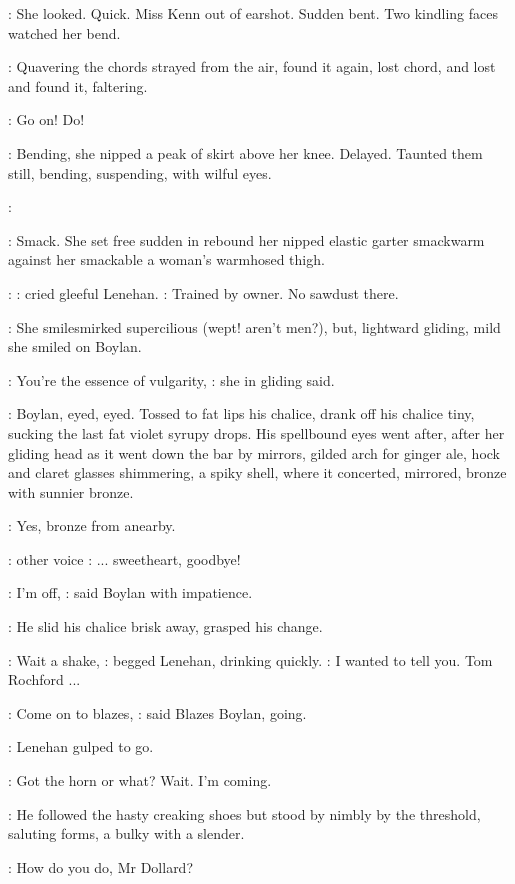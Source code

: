 :
She looked. Quick. Miss Kenn out of earshot. Sudden bent. Two
kindling faces watched her bend.

:
Quavering the chords strayed from the air, found it again, lost chord,
and lost and found it, faltering.

\Lenehan:
Go on! Do! 

:
Bending, she nipped a peak of skirt above her knee.
Delayed. Taunted
them still, bending, suspending, with wilful eyes.

\Lenehan:

:
Smack. She set free sudden in rebound her nipped elastic garter
smackwarm against her smackable a woman's warmhosed thigh.

\Lenehan:
:
cried gleeful Lenehan.
\Lenehan:
Trained by owner. No sawdust there.

:
She smilesmirked supercilious (wept! aren't men?), but, lightward
gliding, mild she smiled on Boylan.

\MissD:
You're the essence of vulgarity,
:
she in gliding said.

:
Boylan, eyed, eyed. Tossed to fat lips his chalice, drank off his
chalice tiny, sucking the last fat violet syrupy drops.
His spellbound eyes went after, after her gliding head
as it went down the bar by mirrors, gilded
arch for ginger ale, hock and claret glasses shimmering, a spiky shell,
where it concerted, mirrored, bronze with sunnier bronze.

:
Yes, bronze from anearby.

\Stage:
other voice
\Song:
... sweetheart, goodbye!

\boylan:
I'm off,
:
said Boylan with impatience.

:
He slid his chalice brisk away, grasped his change.

\Lenehan:
Wait a shake,
:
begged Lenehan, drinking quickly.
\Lenehan:
I wanted to tell you.
Tom Rochford ...

\boylan:
Come on to blazes,
:
said Blazes Boylan, going.

:
Lenehan gulped to go.

\Lenehan:
Got the horn or what? Wait. I'm coming.

:
He followed the hasty creaking shoes but stood by nimbly by the
threshold, saluting forms, a bulky with a slender.

\Lenehan:
How do you do, Mr Dollard?

